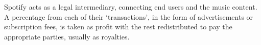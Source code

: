 \par
Spotify acts as a legal intermediary, connecting end users and the music content. A percentage from each of their `transactions', in the form of advertisements or subscription fees, is taken as profit with the rest redistributed to pay the appropriate parties, usually as royalties.